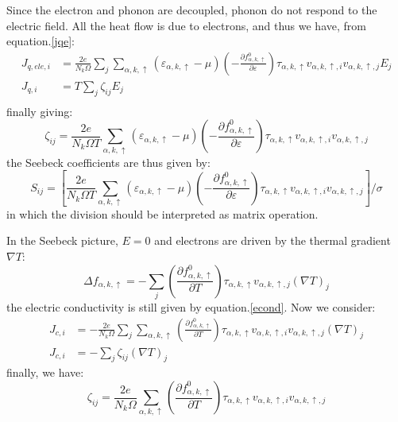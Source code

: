 \documentclass{article}
\newcommand{\pfrac}[2]{\frac{\partial #1}{\partial #2}}
\newcommand{\fak}{f_{\alpha,k,\uparrow}}
\newcommand{\ak}{\alpha,k,\uparrow}
\begin{document}
Since the electron and phonon are decoupled, phonon do not respond to the electric field. All the 
heat flow is due to electrons, and thus we have, from equation.\ref{jqe}:
\begin{align}
    J_{q,ele,i} &= \frac{2e}{N_k \Omega} \sum_j \sum_{\ak} (\varepsilon_{\ak}-\mu)  \left(-\pfrac{\fak^0}{\varepsilon}\right) \tau_{\ak} v_{\ak,i}v_{\ak,j} E_j \\
    J_{q,i} &= T \sum_j \zeta_{ij} E_j \\
\end{align}
finally giving: 
\begin{equation}
    \zeta_{ij} = \frac{2e}{N_k \Omega T} \sum_{\ak} (\varepsilon_{\ak}-\mu)  \left(-\pfrac{\fak^0}{\varepsilon}\right) \tau_{\ak} v_{\ak,i}v_{\ak,j} \label{zeta_uncouple_peltier}
\end{equation}
the Seebeck coefficients are thus given by: 
\begin{equation}
    S_{ij} = \left[ \frac{2e}{N_k \Omega T} \sum_{\ak} (\varepsilon_{\ak}-\mu)  \left(-\pfrac{\fak^0}{\varepsilon}\right) \tau_{\ak} v_{\ak,i}v_{\ak,j} \right] / \sigma
\end{equation}
in which the division should be interpreted as matrix operation. 

In the Seebeck picture, $E= 0$ and electrons are driven by the thermal gradient $\nabla T $:
\begin{equation}
    \Delta \fak = - \sum_j \left(\pfrac{\fak^0}{T}\right) \tau_{\ak} v_{\ak,j} (\nabla T)_j
\end{equation}
the electric conductivity is still given by equation.\ref{econd}. Now we consider:
\begin{align}
    J_{c,i} &= -\frac{2e}{N_k \Omega} \sum_j \sum_{\ak}\left(\pfrac{\fak^0}{T}\right) \tau_{\ak}v_{\ak,i}v_{\ak,j} (\nabla T)_j \\
    J_{c,i} &= -\sum_j \zeta_{ij} (\nabla T)_j 
\end{align}
finally, we have:
\begin{equation} 
    \zeta_{ij} = \frac{2e}{N_k \Omega}\sum_{\ak}\left(\pfrac{\fak^0}{T}\right) \tau_{\ak}v_{\ak,i}v_{\ak,j} \label{zeta_uncouple_seebeck}
\end{equation}
\end{document}
